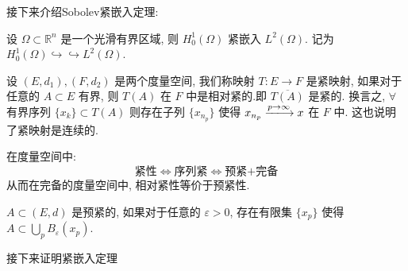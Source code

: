 \documentclass[11pt]{ctexart}[UTF8]
\begin{document}
接下来介绍Sobolev紧嵌入定理:\par
\begin{theorem}
    设 $\Omega \subset \mathbb{R}^n$ 是一个光滑有界区域, 则 $H_{0}^{1}(\Omega)$ 紧嵌入 $L^2(\Omega)$. 记为 $H_{0}^{1}(\Omega) \hookrightarrow\hookrightarrow L^2(\Omega)$.
\end{theorem}
\begin{remark}
    设 $(E,d_{1}),(F,d_{2})$ 是两个度量空间, 我们称映射 $T: E \longrightarrow F$ 是紧映射, 如果对于任意的 $A \subset E$ 有界, 则 $T(A)$ 在 $F$ 中是相对紧的.即
    $\overline{T(A)}$ 是紧的. 换言之, $\forall$ 有界序列 $\{ x_{k}\} \subset T(A)$ 则存在子列 $\{ x_{n_{p}} \}$ 使得 $x_{n_{p}} \xlongrightarrow{p \to \infty} x$ 在 $F$ 中. 这也说明了紧映射是连续的.
\end{remark}
\begin{remark}
    在度量空间中: 
    \begin{equation*}
        \text{紧性} \Longleftrightarrow  \text{序列紧} \Longleftrightarrow\text{预紧+完备}
    \end{equation*}
    从而在完备的度量空间中, 相对紧性等价于预紧性. 
\end{remark}
\begin{definition}[预紧性]
    $A \subset (E,d)$ 是预紧的, 如果对于任意的 $\varepsilon > 0$, 存在有限集 $\{ x_{p} \}$ 使得 $A \subset \bigcup\limits_{p} B_{\varepsilon}(x_{p})$.
\end{definition}
接下来证明紧嵌入定理
\end{document}
